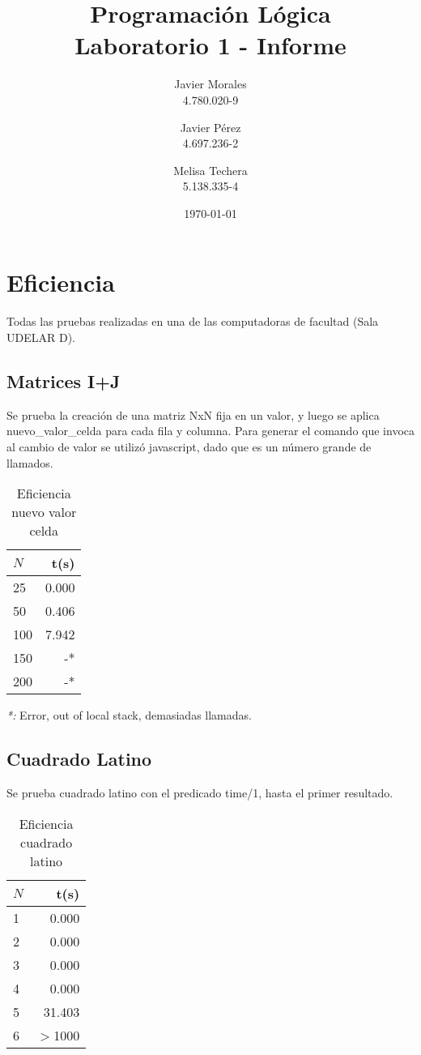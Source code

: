 \documentclass[]{article}
\title{Programación Lógica \\ Laboratorio 1 - Informe}
\author{
	Javier Morales\\
	4.780.020-9\\
	\and
	Javier Pérez\\
	4.697.236-2
	\and
	Melisa Techera\\
	5.138.335-4
}
\date{\today}
\begin{document}
\maketitle

\section{Eficiencia}

Todas las pruebas realizadas en una de las computadoras de facultad (Sala UDELAR D).

\subsection{Matrices I+J}

Se prueba la creación de una matriz NxN fija en un valor, y luego se aplica nuevo\_valor\_celda para cada fila y columna. Para generar el comando que invoca al cambio de valor se utilizó javascript, dado que es un número grande de llamados.

\begin{table}[h!]
	\begin{center}
		\caption{Eficiencia nuevo valor celda}
		\label{tab:table1}
		\begin{tabular}{l|r} %
			\textbf{$N$} & \textbf{t(s)}\\
			\hline
			25 & 0.000 \\
			50 & 0.406 \\
			100 & 7.942 \\
			150 & -* \\
			200 & -* \\
		\end{tabular}
	\end{center}
\end{table}

\emph{*:} Error, out of local stack, demasiadas llamadas.
\newpage
\subsection{Cuadrado Latino}

Se prueba cuadrado latino con el predicado time/1, hasta el primer resultado.

\begin{table}[h!]
	\begin{center}
		\caption{Eficiencia cuadrado latino}
		\label{tab:table1}
		\begin{tabular}{l|r} %
			\textbf{$N$} & \textbf{t(s)}\\
			\hline
			1 & 0.000 \\
			2 & 0.000 \\
			3 & 0.000 \\
			4 & 0.000 \\
			5 & 31.403 \\
			6 & $>$1000 \\		
		\end{tabular}
	\end{center}
\end{table}
\end{document}
